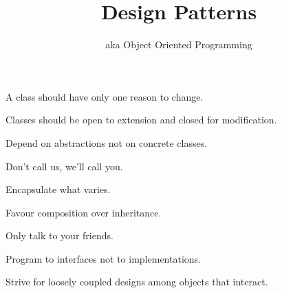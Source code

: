 \documentclass{beamer}
\title{Design Patterns}
\subtitle{aka Object Oriented Programming}
\begin{document}
\begin{frame}
  \titlepage
\end{frame}

\begin{frame}{A class should have only one reason to change.}
    \begin{itemize}
    \end{itemize}
\end{frame}

\begin{frame}{Classes should be open to extension and closed for modification.}
    \begin{itemize}
    \end{itemize}
\end{frame}

\begin{frame}{Depend on abstractions not on concrete classes.}
    \begin{itemize}
    \end{itemize}
\end{frame}

\begin{frame}{Don't call us, we'll call you.}
    \begin{itemize}
    \end{itemize}
\end{frame}

\begin{frame}{Encapsulate what varies.}
    \begin{itemize}
    \end{itemize}
\end{frame}

\begin{frame}{Favour composition over inheritance.}
    \begin{itemize}
    \end{itemize}
\end{frame}

\begin{frame}{Only talk to your friends.}
    \begin{itemize}
    \end{itemize}
\end{frame}

\begin{frame}{Program to interfaces not to implementations.}
    \begin{itemize}
    \end{itemize}
\end{frame}

\begin{frame}{Strive for loosely coupled designs among objects that interact.}
    \begin{itemize}
    \end{itemize}
\end{frame}
\end{document}
